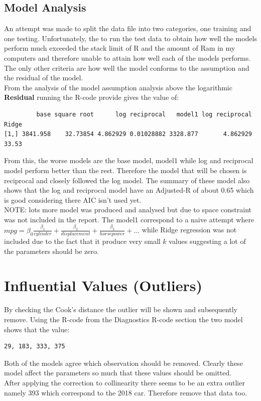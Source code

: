 \documentclass[11pt]{article} %
\begin{document}
\subsection{Model Analysis}
An attempt was made to split the data file into two categories, one training and one testing. Unfortunately, the to run the test data to obtain how well the models perform much exceeded the stack limit of R and the amount of Ram in my computers and therefore unable to attain how well each of the models performs. The only other criteria are how well the model conforms to the assumption and the residual of the model.\\
From the analysis of the model assumption analysis above the logarithmic 
\textbf{Residual}
running the R-code provide gives the value of:
\begin{lstlisting}
         base square root      log reciprocal   model1 log reciprocal Ridge
[1,] 3841.958    32.73854 4.862929 0.01028882 3328.877       4.862929 33.53
\end{lstlisting}
From this, the worse models are the base model, model1 while log and reciprocal model perform better than the rest. Therefore the model that will be chosen is reciprocal and closely followed the log model. The summary of these model also shows that the log and reciprocal model have an Adjusted-R of about 0.65 which is good considering there AIC isn't used yet.\\
NOTE: lots more model was produced and analysed but due to space constraint was not included in the report. The model1 correspond to a naive attempt where $mpg =\beta_0 \frac{\beta_1}{cylinder}+\frac{\beta_2}{displacement}+\frac{\beta_3}{horsepower}+...$ while Ridge regression was not included due to the fact that it produce very small $k$ values suggesting a lot of the parameters should be zero.
\section{Influential Values (Outliers)}
By checking the Cook's distance the outlier will be shown and subsequently remove. Using the R-code from the Diagnostics R-code section the two model shows that the value:
\begin{lstlisting}
29, 183, 333, 375 
\end{lstlisting}
Both of the models agree which observation should be removed.
Clearly these model affect the parameters so much that these values should be omitted.\\
After applying the correction to collinearity there seems to be an extra outlier namely 393 which correspond to the 2018 car. Therefore remove that data too.
\end{document}
